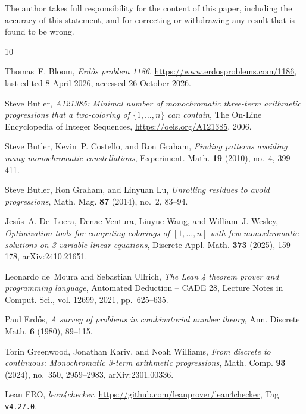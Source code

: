 \documentclass[11pt]{amsart}
\theoremstyle{remark}
\begin{document}
The author takes full responsibility for the content of this paper, including the accuracy of this statement, and for correcting or withdrawing any result that is found to be wrong.


\providecommand{\bysame}{\leavevmode\hbox to3em{\hrulefill}\thinspace}
\providecommand{\MR}{\relax\ifhmode\unskip\space\fi MR }
\providecommand{\MRhref}[2]{%
  \href{http://www.ams.org/mathscinet-getitem?mr=#1}{#2}
}
\providecommand{\href}[2]{#2}
\begin{thebibliography}{10}

Thomas~F. Bloom, \emph{Erd{\H o}s problem 1186},
  \url{https://www.erdosproblems.com/1186}, last edited 8 April 2026, accessed
  26 October 2026.

Steve Butler, \emph{A121385: Minimal number of monochromatic three-term
  arithmetic progressions that a two-coloring of $\{1,\dots,n\}$ can contain},
  The On-Line Encyclopedia of Integer Sequences,
  \url{https://oeis.org/A121385}, 2006.

Steve Butler, Kevin~P. Costello, and Ron Graham, \emph{Finding patterns
  avoiding many monochromatic constellations}, Experiment. Math. \textbf{19}
  (2010), no.~4, 399--411.

Steve Butler, Ron Graham, and Linyuan Lu, \emph{Unrolling residues to avoid
  progressions}, Math. Mag. \textbf{87} (2014), no.~2, 83--94.

Jes{\'u}s~A. De~Loera, Denae Ventura, Liuyue Wang, and William~J. Wesley,
  \emph{Optimization tools for computing colorings of $[1,\dots,n]$ with few
  monochromatic solutions on 3-variable linear equations}, Discrete Appl. Math.
  \textbf{373} (2025), 159--178, arXiv:2410.21651.

Leonardo de~Moura and Sebastian Ullrich, \emph{The {L}ean 4 theorem prover and
  programming language}, Automated Deduction -- CADE 28, Lecture Notes in
  Comput. Sci., vol. 12699, 2021, pp.~625--635.

Paul Erd{\H o}s, \emph{A survey of problems in combinatorial number theory},
  Ann. Discrete Math. \textbf{6} (1980), 89--115.

Torin Greenwood, Jonathan Kariv, and Noah Williams, \emph{From discrete to
  continuous: Monochromatic 3-term arithmetic progressions}, Math. Comp.
  \textbf{93} (2024), no.~350, 2959--2983, arXiv:2301.00336.

{Lean FRO}, \emph{lean4checker},
  \url{https://github.com/leanprover/lean4checker}, Tag \texttt{v4.27.0}.


\end{thebibliography}
\end{document}
